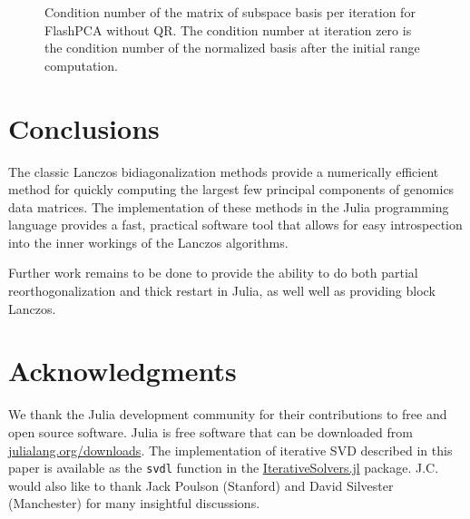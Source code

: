 \documentclass[review]{siamart0516}
\begin{document}
\begin{figure}
    \centering
    \caption{Condition number of the matrix of subspace basis per iteration for FlashPCA without QR. The condition number at iteration zero is the condition number of the normalized basis after the initial range computation.}
\end{figure}

\section{Conclusions}

The classic Lanczos bidiagonalization methods provide a numerically efficient
method for quickly computing the largest few principal components of genomics
data matrices. The implementation of these methods in the Julia programming
language provides a fast, practical software tool that allows for easy
introspection into the inner workings of the Lanczos algorithms.

Further work remains to be done to provide the ability to do both partial
reorthogonalization and thick restart in Julia, as well well as providing
block Lanczos.

\section*{Acknowledgments}

We thank the Julia development community for their contributions to free and
open source software. Julia is free software that can be downloaded from
\url{julialang.org/downloads}. The implementation of iterative SVD described in
this paper is available as the \verb|svdl| function in the
\href{https://github.com/JuliaLang/IterativeSolvers.jl}{IterativeSolvers.jl}
package. J.C. would also like to thank Jack Poulson (Stanford) and David Silvester
(Manchester) for many insightful discussions.


\end{document}
